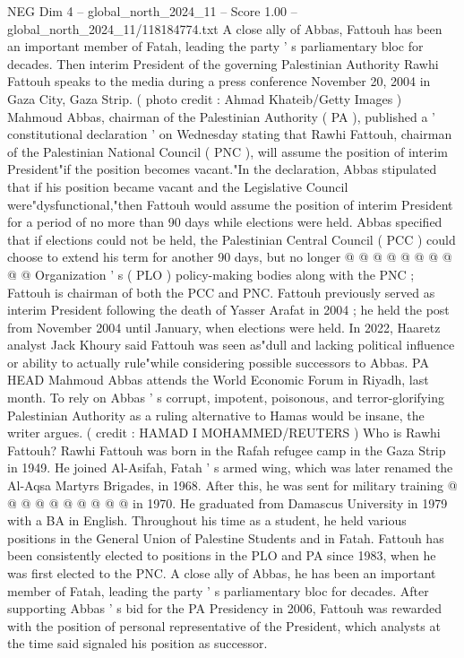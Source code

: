 \begin{textsample}{NEG Dim 4 – global\_north\_2024\_11 – Score 1.00 – global\_north\_2024\_11/118184774.txt}  \label{ex:f4_neg_164}
A close ally of Abbas, Fattouh has been an important member of Fatah, leading the party ' s parliamentary bloc for decades.
Then interim President of the governing Palestinian Authority Rawhi Fattouh speaks to the media during a press conference November 20, 2004 in Gaza City, Gaza Strip. ( photo credit : Ahmad Khateib/Getty Images ) Mahmoud Abbas, chairman of the Palestinian Authority ( PA ), published a ' constitutional declaration ' on Wednesday stating that Rawhi Fattouh, chairman of the Palestinian National Council ( PNC ), will assume the position of interim President"if the position becomes vacant."In the declaration, Abbas stipulated that if his position became vacant and the Legislative Council were"dysfunctional,"then Fattouh would assume the position of interim President for a period of no more than 90 days while elections were held.
Abbas specified that if elections could not be held, the Palestinian Central Council ( PCC ) could choose to extend his term for another 90 days, but no longer @ @ @ @ @ @ @ @ @ @ Organization ' s ( PLO ) policy-making bodies along with the PNC ; Fattouh is chairman of both the PCC and PNC.
Fattouh previously served as interim President following the death of Yasser Arafat in 2004 ; he held the post from November 2004 until January, when elections were held.
In 2022, Haaretz analyst Jack Khoury said Fattouh was seen as"dull and lacking political influence or ability to actually rule"while considering possible successors to Abbas.
PA HEAD Mahmoud Abbas attends the World Economic Forum in Riyadh, last month.
To rely on Abbas ' s corrupt, impotent, poisonous, and terror-glorifying Palestinian Authority as a ruling alternative to Hamas would be insane, the writer argues. ( credit : HAMAD I MOHAMMED/REUTERS ) Who is Rawhi Fattouh?
Rawhi Fattouh was born in the Rafah refugee camp in the Gaza Strip in 1949.
He joined Al-Asifah, Fatah ' s armed wing, which was later renamed the Al-Aqsa Martyrs Brigades, in 1968.
After this, he was sent for military training @ @ @ @ @ @ @ @ @ @ in 1970.
He graduated from Damascus University in 1979 with a BA in English.
Throughout his time as a student, he held various positions in the General Union of Palestine Students and in Fatah.
Fattouh has been consistently elected to positions in the PLO and PA since 1983, when he was first elected to the PNC.
A close ally of Abbas, he has been an important member of Fatah, leading the party ' s parliamentary bloc for decades.
After supporting Abbas ' s bid for the PA Presidency in 2006, Fattouh was rewarded with the position of personal representative of the President, which analysts at the time said signaled his position as successor.

\end{textsample}
